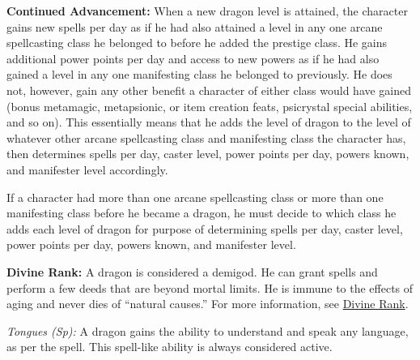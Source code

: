 {
\textbf{Continued Advancement:} When a new dragon level is attained, the character gains new spells per day as if he had also attained a level in any one arcane spellcasting class he belonged to before he added the prestige class. He gains additional power points per day and access to new powers as if he had also gained a level in any one manifesting class he belonged to previously. He does not, however, gain any other benefit a character of either class would have gained (bonus metamagic, metapsionic, or item creation feats, psicrystal special abilities, and so on). This essentially means that he adds the level of dragon to the level of whatever other arcane spellcasting class and manifesting class the character has, then determines spells per day, caster level, power points per day, powers known, and manifester level accordingly.

If a character had more than one arcane spellcasting class or more than one manifesting class before he became a dragon, he must decide to which class he adds each level of dragon for purpose of determining spells per day, caster level, power points per day, powers known, and manifester level.

\textbf{Divine Rank:} A dragon is considered a demigod. He can grant spells and perform a few deeds that are beyond mortal limits. He is immune to the effects of aging and never dies of ``natural causes.'' For more information, see \hyperref[Divine Rank]{Divine Rank}.

\textit{Tongues (Sp):} A dragon gains the ability to understand and speak any language, as per the  spell. This spell-like ability is always considered active.

}
